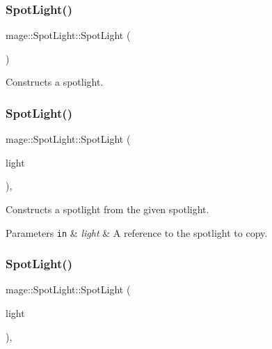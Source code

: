 \subsubsection{\texorpdfstring{Spot\+Light()}{SpotLight()}\hspace{0.1cm}{\footnotesize\ttfamily [1/3]}}
{\footnotesize\ttfamily mage\+::\+Spot\+Light\+::\+Spot\+Light (\begin{DoxyParamCaption}{ }\end{DoxyParamCaption})\hspace{0.3cm}{\ttfamily [noexcept]}}

Constructs a spotlight. \hypertarget{classmage_1_1_spot_light_a93287b22630e43766fdab04e0c235a30}{}\label{classmage_1_1_spot_light_a93287b22630e43766fdab04e0c235a30} 
\subsubsection{\texorpdfstring{Spot\+Light()}{SpotLight()}\hspace{0.1cm}{\footnotesize\ttfamily [2/3]}}
{\footnotesize\ttfamily mage\+::\+Spot\+Light\+::\+Spot\+Light (\begin{DoxyParamCaption}\item[{const \hyperlink{classmage_1_1_spot_light}{Spot\+Light} \&}]{light }\end{DoxyParamCaption})\hspace{0.3cm}{\ttfamily [default]}, {\ttfamily [noexcept]}}

Constructs a spotlight from the given spotlight.


\begin{DoxyParams}[1]{Parameters}
\mbox{\tt in}  & {\em light} & A reference to the spotlight to copy. \\
\hline
\end{DoxyParams}
\hypertarget{classmage_1_1_spot_light_a694e2e49340440515438a86baa284431}{}\label{classmage_1_1_spot_light_a694e2e49340440515438a86baa284431} 
\subsubsection{\texorpdfstring{Spot\+Light()}{SpotLight()}\hspace{0.1cm}{\footnotesize\ttfamily [3/3]}}
{\footnotesize\ttfamily mage\+::\+Spot\+Light\+::\+Spot\+Light (\begin{DoxyParamCaption}\item[{\hyperlink{classmage_1_1_spot_light}{Spot\+Light} \&\&}]{light }\end{DoxyParamCaption})\hspace{0.3cm}{\ttfamily [default]}, {\ttfamily [noexcept]}}

